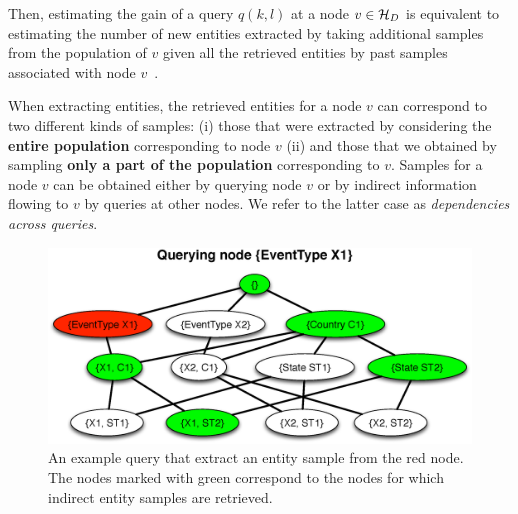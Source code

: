 
Then, estimating the gain of a query $q(k,l)$ at a node $v \in \mathcal{H}_D$ is equivalent to estimating the number of new entities extracted by taking additional samples from the population of $v$ given all the retrieved entities by past samples associated with node $v$~\cite{trushkowsky:2013}. 

 When extracting entities,  the retrieved entities for a node $v$ can correspond to two different kinds of samples: (i) those that were extracted by considering the {\bf entire population} corresponding to node $v$ (ii) and those that we obtained by sampling {\bf only a part of the population} corresponding to $v$. Samples for a node $v$ can be obtained either by querying node $v$ or by indirect information flowing to $v$ by queries at other nodes. We refer to the latter case as {\em dependencies across queries}. 
\begin{figure}[h]
	\begin{center}
	\vspace{-10pt}
	\includegraphics[clip,scale=0.3]{figs/exampleQuery.eps}
	\caption{An example query that extract an entity sample from the red node. The nodes marked with green correspond to the nodes for which indirect entity samples are retrieved.}
	\label{fig:query}
	\vspace{-10pt}
	\end{center}
	\vspace{-5pt}
\end{figure}

